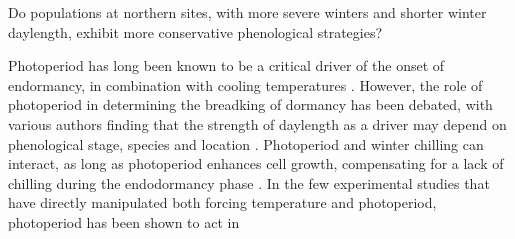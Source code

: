 \documentclass{article}
\begin{document}
Do populations at northern sites, with more severe winters and shorter winter daylength, exhibit more conservative phenological strategies?






Photoperiod has long been known to be a critical driver of the onset of endormancy, in combination with cooling temperatures \cite{Foley:2009aa}. However, the role of photoperiod in determining the breadking of dormancy has been debated, with various authors finding that the strength of daylength as a driver may depend on phenological stage, species and location \cite{Heide:1993}\cite{Falusi:1996aa}. Photoperiod and winter chilling can interact, as long as photoperiod enhances cell growth, compensating for a lack of chilling during the endodormancy phase \cite{Heide:1993b}\cite{Caffarra:2011aa}\cite{Myking:1995aa}. In the few experimental studies that have directly manipulated both forcing temperature and photoperiod, photoperiod has been shown to act in 
\end{document}
